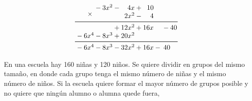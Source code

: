 \documentclass[11pt,addpoints]{exam}
\begin{document}
\begin{questions}
  \begin{solutionbox}{5.5cm}
    \[ \begin{array}{*{16}{@{}>{{}}r<{{}}@{}}}
         &  &   & \multirow{2.5}{*}{$ {}\times{} $} &  & - & 3x^2 &  & - & 4x    &  & + & 10  &   &    &    \\
         &  &   &                                   &  &   &      &  &   & 2x^2  &  & - & 4   &   &    &    \\
        \cmidrule[0.6pt](l{-1pt}r{-1pt}){1-16}
         &  &   &                                   &  &   &      &  & + & 12x^2 &  & + & 16x &   & -  & 40 \\
         &  & - & 6x^4                              &  & - & 8x^3 &  & + & 20x^2 &  &   &     &   &    &    \\
        \cmidrule[0.6pt](l{-1pt}r{-1pt}){1-16}
         &  & - & 6x^4                              &  & - & 8x^3 &  & - & 32x^2 &  & + & 16x & - & 40 &
      \end{array}
    \]
  \end{solutionbox}

  \newpage
  \question[20] En una escuela hay 160 niñas y 120 niños. Se quiere dividir en grupos del mismo tamaño,
  en donde cada grupo tenga el mismo número de niñas y el mismo número de niños. Si la escuela quiere formar el mayor número de grupos posible
  y no quiere que ningún alumno o alumna quede fuera,

  \begin{parts}

\end{parts}
\end{questions}
\end{document}

